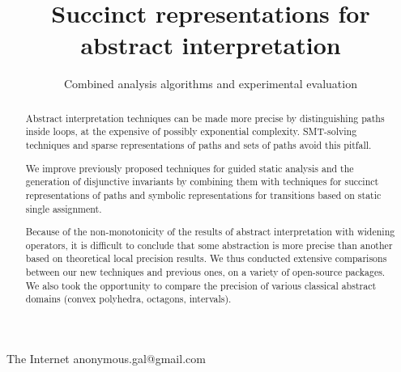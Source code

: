 \documentclass[preprint]{sigplanconf}
\begin{document}
\copyrightdata{[to be supplied]} 


\title{Succinct representations for abstract interpretation}
\subtitle{Combined analysis algorithms and experimental evaluation}

           {The Internet}
           {anonymous.gal@gmail.com}

\maketitle

\begin{abstract}
Abstract interpretation techniques can be made more precise by distinguishing paths inside loops, at the expensive of possibly exponential complexity. SMT-solving techniques and sparse representations of paths and sets of paths avoid this pitfall.

We improve previously proposed techniques for guided static analysis and the generation of disjunctive invariants by combining them with techniques for succinct representations of paths and symbolic representations for transitions based on static single assignment.

Because of the non-monotonicity of the results of abstract interpretation with widening operators, it is difficult to conclude that some abstraction is more precise than another based on theoretical local precision results. We thus conducted extensive comparisons between our new techniques and previous ones, on a variety of open-source packages. We also took the opportunity to compare the precision of various classical abstract domains (convex polyhedra, octagons, intervals).
\end{abstract}

\end{document}
